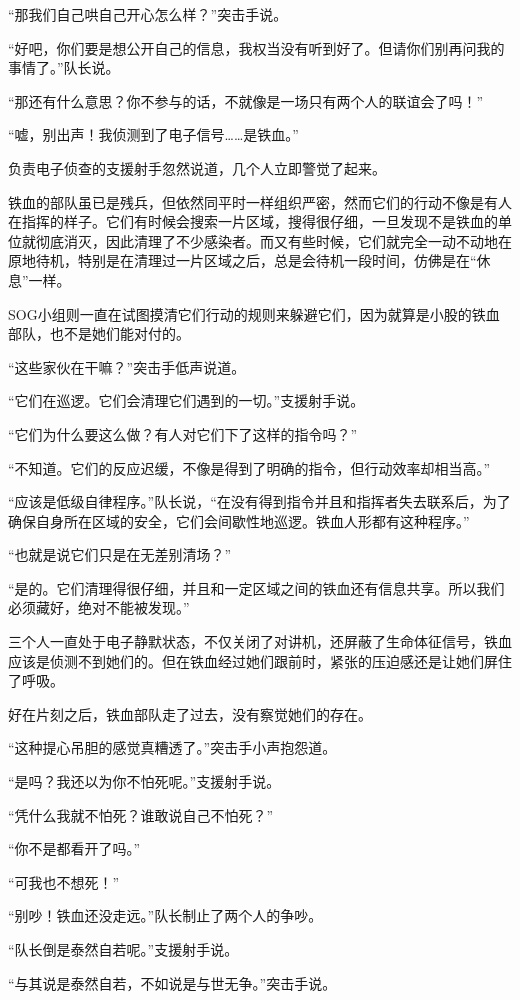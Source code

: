 “那我们自己哄自己开心怎么样？”突击手说。

“好吧，你们要是想公开自己的信息，我权当没有听到好了。但请你们别再问我的事情了。”队长说。

“那还有什么意思？你不参与的话，不就像是一场只有两个人的联谊会了吗！”

“嘘，别出声！我侦测到了电子信号……是铁血。”

负责电子侦查的支援射手忽然说道，几个人立即警觉了起来。

铁血的部队虽已是残兵，但依然同平时一样组织严密，然而它们的行动不像是有人在指挥的样子。它们有时候会搜索一片区域，搜得很仔细，一旦发现不是铁血的单位就彻底消灭，因此清理了不少感染者。而又有些时候，它们就完全一动不动地在原地待机，特别是在清理过一片区域之后，总是会待机一段时间，仿佛是在“休息”一样。

SOG小组则一直在试图摸清它们行动的规则来躲避它们，因为就算是小股的铁血部队，也不是她们能对付的。

“这些家伙在干嘛？”突击手低声说道。

“它们在巡逻。它们会清理它们遇到的一切。”支援射手说。

“它们为什么要这么做？有人对它们下了这样的指令吗？”

“不知道。它们的反应迟缓，不像是得到了明确的指令，但行动效率却相当高。”

“应该是低级自律程序。”队长说，“在没有得到指令并且和指挥者失去联系后，为了确保自身所在区域的安全，它们会间歇性地巡逻。铁血人形都有这种程序。”

“也就是说它们只是在无差别清场？”

“是的。它们清理得很仔细，并且和一定区域之间的铁血还有信息共享。所以我们必须藏好，绝对不能被发现。”

三个人一直处于电子静默状态，不仅关闭了对讲机，还屏蔽了生命体征信号，铁血应该是侦测不到她们的。但在铁血经过她们跟前时，紧张的压迫感还是让她们屏住了呼吸。

好在片刻之后，铁血部队走了过去，没有察觉她们的存在。

“这种提心吊胆的感觉真糟透了。”突击手小声抱怨道。

“是吗？我还以为你不怕死呢。”支援射手说。

“凭什么我就不怕死？谁敢说自己不怕死？”

“你不是都看开了吗。”

“可我也不想死！”

“别吵！铁血还没走远。”队长制止了两个人的争吵。

“队长倒是泰然自若呢。”支援射手说。

“与其说是泰然自若，不如说是与世无争。”突击手说。

